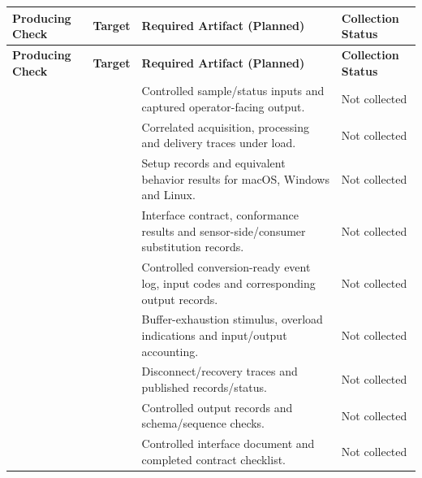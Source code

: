 \begin{tabularx}{\linewidth}{L{2.6cm}L{2.7cm}YL{2.1cm}}
\caption{Planned Project Evidence Slots\label{Table:PlannedProjectEvidence}}\\
\toprule\textbf{Producing Check} & \textbf{Target} & \textbf{Required Artifact (Planned)} & \textbf{Collection Status}\\\midrule\endfirsthead
\toprule\textbf{Producing Check} & \textbf{Target} & \textbf{Required Artifact (Planned)} & \textbf{Collection Status}\\\midrule\endhead\bottomrule\endlastfoot
{}\label{PlannedEvidence:VER-010} &  & Controlled sample/status inputs and captured operator-facing output. & Not collected\\
\label{PlannedEvidence:VER-011} &  & Correlated acquisition, processing and delivery traces under load. & Not collected\\
\label{PlannedEvidence:VER-012} &  & Setup records and equivalent behavior results for macOS, Windows and Linux. & Not collected\\
\label{PlannedEvidence:VER-013} &  & Interface contract, conformance results and sensor-side/consumer substitution records. & Not collected\\
\label{PlannedEvidence:VER-014} &  & Controlled conversion-ready event log, input codes and corresponding output records. & Not collected\\
\label{PlannedEvidence:VER-015} &  & Buffer-exhaustion stimulus, overload indications and input/output accounting. & Not collected\\
\label{PlannedEvidence:VER-016} &  & Disconnect/recovery traces and published records/status. & Not collected\\
\label{PlannedEvidence:VER-017} &  & Controlled output records and schema/sequence checks. & Not collected\\
\label{PlannedEvidence:VER-018} &  & Controlled interface document and completed contract checklist. & Not collected\\

\end{tabularx}
